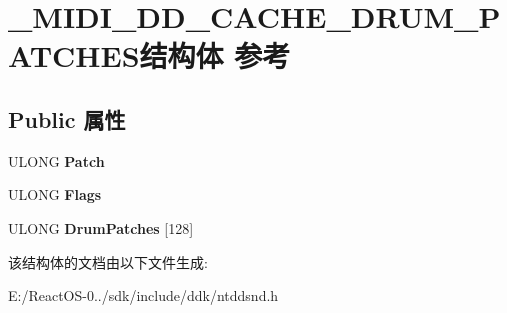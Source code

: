 \hypertarget{struct___m_i_d_i___d_d___c_a_c_h_e___d_r_u_m___p_a_t_c_h_e_s}{}\section{\+\_\+\+M\+I\+D\+I\+\_\+\+D\+D\+\_\+\+C\+A\+C\+H\+E\+\_\+\+D\+R\+U\+M\+\_\+\+P\+A\+T\+C\+H\+E\+S结构体 参考}
\label{struct___m_i_d_i___d_d___c_a_c_h_e___d_r_u_m___p_a_t_c_h_e_s}
\subsection*{Public 属性}
\begin{DoxyCompactItemize}
\item 
\mbox{\label{struct___m_i_d_i___d_d___c_a_c_h_e___d_r_u_m___p_a_t_c_h_e_s_abff0a7e4c559c45703d756ce7864e3ed}} 
U\+L\+O\+NG {\bfseries Patch}
\item 
\mbox{\label{struct___m_i_d_i___d_d___c_a_c_h_e___d_r_u_m___p_a_t_c_h_e_s_a5e7eb6bd8acc6b8b6f4ebf96fb1f41ab}} 
U\+L\+O\+NG {\bfseries Flags}
\item 
\mbox{\label{struct___m_i_d_i___d_d___c_a_c_h_e___d_r_u_m___p_a_t_c_h_e_s_a5937ef2a228b5ed089910b862428824f}} 
U\+L\+O\+NG {\bfseries Drum\+Patches} \mbox{[}128\mbox{]}
\end{DoxyCompactItemize}


该结构体的文档由以下文件生成\+:\begin{DoxyCompactItemize}
\item 
E\+:/\+React\+O\+S-\/0../sdk/include/ddk/ntddsnd.\+h\end{DoxyCompactItemize}
